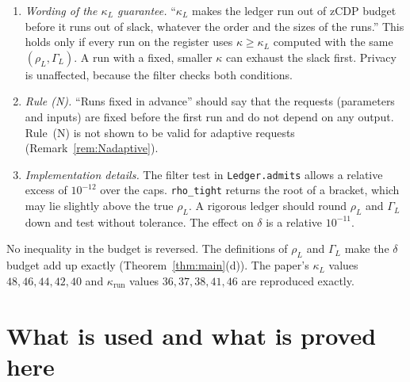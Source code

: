 \documentclass[11pt]{article}
\theoremstyle{definition}
\theoremstyle{plain}
\begin{document}
\begin{enumerate}[label=(I\arabic*)]
  \item \emph{Wording of the $\kappa_L$ guarantee.} ``$\kappa_L$ makes the ledger run out of zCDP budget before it runs out of slack, whatever the order and the sizes of the runs.'' This holds only if every run on the register uses $\kappa\ge\kappa_L$ computed with the same $(\rho_L,\Gamma_L)$. A run with a fixed, smaller $\kappa$ can exhaust the slack first. Privacy is unaffected, because the filter checks both conditions.
  \item \emph{Rule (N).} ``Runs fixed in advance'' should say that the requests (parameters and inputs) are fixed before the first run and do not depend on any output. Rule~(N) is not shown to be valid for adaptive requests (Remark~\ref{rem:Nadaptive}).
  \item \emph{Implementation details.} The filter test in \texttt{Ledger.admits} allows a relative excess of $10^{-12}$ over the caps. \texttt{rho\_tight} returns the root of a bracket, which may lie slightly above the true $\rho_L$. A rigorous ledger should round $\rho_L$ and $\Gamma_L$ down and test without tolerance. The effect on $\delta$ is a relative $10^{-11}$.
\end{enumerate}
No inequality in the budget is reversed. The definitions of $\rho_L$ and $\Gamma_L$ make the $\delta$ budget add up exactly (Theorem~\ref{thm:main}(d)). The paper's $\kappa_L$ values $48,46,44,42,40$ and $\kappa_{\mathrm{run}}$ values $36,37,38,41,46$ are reproduced exactly.

\section{What is used and what is proved here}
\label{sec:used}
\end{document}
